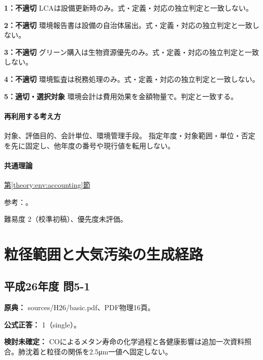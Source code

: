 \noindent\textbf{1：不適切} LCAは設備更新時のみ。式・定義・対応の独立判定と一致しない。\par

\noindent\textbf{2：不適切} 環境報告書は設備の自治体届出。式・定義・対応の独立判定と一致しない。\par

\noindent\textbf{3：不適切} グリーン購入は生物資源優先のみ。式・定義・対応の独立判定と一致しない。\par

\noindent\textbf{4：不適切} 環境監査は税務処理のみ。式・定義・対応の独立判定と一致しない。\par

\noindent\textbf{5：適切・選択対象} 環境会計は費用効果を金額物量で。判定と一致する。\par

\paragraph{再利用する考え方} 対象、評価目的、会計単位、環境管理手段。 指定年度・対象範囲・単位・否定を先に固定し、他年度の番号や現行値を転用しない。

\paragraph{共通理論} \hyperref[theory:env:accounting]{第\ref*{theory:env:accounting}節}

\par 参考：\cite{env58_accounting}。

\par 難易度 2（校準初稿）、優先度未評価。

\section{粒径範囲と大気汚染の生成経路}

\subsection{平成26年度 問5-1}
\label{q:h26-reg-basic-5-1}

\noindent\textbf{原典：} sources/H26/basic.pdf、PDF物理16頁。

\textbf{公式正答：} 1（single）。

\par\textbf{検討未確定：} COによるメタン寿命の化学過程と各健康影響は追加一次資料照合。肺沈着と粒径の関係を2.5μm一値へ固定しない。

